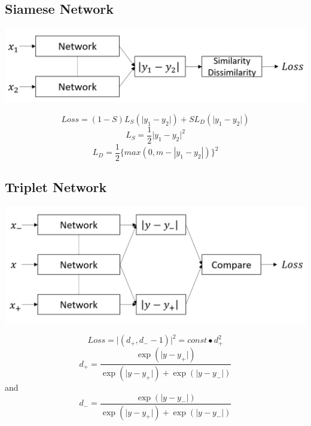 \documentclass[a0,portrait]{a0poster}
\begin{document}
\begin{multicols}{2}
		
		\subsection*{Siamese Network}
		\begin{center}\vspace{1cm}
			\includegraphics[width=0.7\linewidth]{../report_shaoheng/siamese_struct}
		\end{center}\vspace{1cm}
		\begin{equation}
		Loss = (1-S)L_S(\lvert y_1 - y_2 \rvert) + S L_D(\lvert y_1 - y_2 \rvert)
		\end{equation}
		\begin{equation}
		L_S = \frac{1}{2}\lvert y_1 - y_2 \rvert^2
		\end{equation}
		\begin{equation}
		L_D = \frac{1}{2}\{max(0, m-|y_1-y_2|)\}^2
		\end{equation}
		\subsection*{Triplet Network}
		\begin{center}\vspace{1cm}
			\includegraphics[width=0.7\linewidth]{../report_shaoheng/triplet_struct}
		\end{center}\vspace{1cm}
		\begin{equation}
		Loss = \lvert(d_+, d_--1)\rvert^2 = const\bullet d_+^2
		\end{equation}
		\begin{equation}
		d_+ = \frac{\exp{(\lvert y-y_+ \rvert)}}{\exp{(\lvert y-y_+ \rvert)} + \exp{(\lvert y-y_- \rvert)}}
		\end{equation}
		and
		\begin{equation}
		d_- = \frac{\exp{(\lvert y-y_- \rvert)}}{\exp{(\lvert y-y_+ \rvert)} + \exp{(\lvert y-y_- \rvert)}}
		\end{equation}

\end{multicols}
\end{document}
